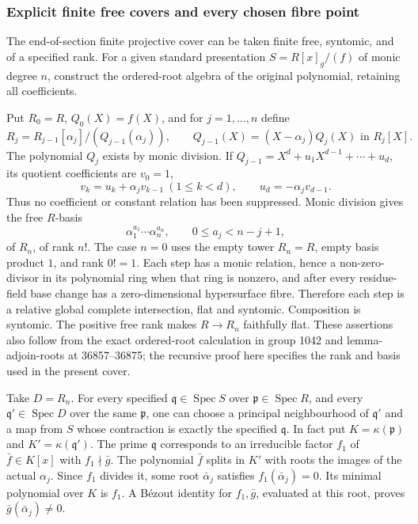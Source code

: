 \subsubsection{Explicit finite free covers and every chosen fibre point}\label{algebra-proof-052-explicit-finite-free-covers-and-every-chosen-fibre-point}

The end-of-section finite projective cover can be taken finite free, syntomic, and of a specified rank. For a given standard presentation \(S=R[x]_g/(f)\) of monic degree \(n\), construct the ordered-root algebra of the original polynomial, retaining all coefficients.

Put \(R_0=R\), \(Q_0(X)=f(X)\), and for \(j=1,\ldots,n\) define \[
R_j=R_{j-1}[\alpha_j]/(Q_{j-1}(\alpha_j)),
\qquad
Q_{j-1}(X)=(X-\alpha_j)Q_j(X)\text{ in }R_j[X].
\] The polynomial \(Q_j\) exists by monic division. If \(Q_{j-1}=X^d+u_1X^{d-1}+\cdots+u_d\), its quotient coefficients are \(v_0=1\), \[
v_k=u_k+\alpha_jv_{k-1}\ (1\le k<d),
\qquad u_d=-\alpha_jv_{d-1}.
\] Thus no coefficient or constant relation has been suppressed. Monic division gives the free \(R\)-basis \[
\alpha_1^{a_1}\cdots\alpha_n^{a_n},
\qquad 0\le a_j<n-j+1,
\] of \(R_n\), of rank \(n!\). The case \(n=0\) uses the empty tower \(R_n=R\), empty basis product \(1\), and rank \(0!=1\). Each step has a monic relation, hence a non-zero-divisor in its polynomial ring when that ring is nonzero, and after every residue-field base change has a zero-dimensional hypersurface fibre. Therefore each step is a relative global complete intersection, flat and syntomic. Composition is syntomic. The positive free rank makes \(R\to R_n\) faithfully flat. These assertions also follow from the exact ordered-root calculation in group 1042 and lemma-adjoin-roots at 36857--36875; the recursive proof here specifies the rank and basis used in the present cover.

Take \(D=R_n\). For every specified \(\mathfrak q\in\operatorname{Spec}S\) over \(\mathfrak p\in\operatorname{Spec}R\), and every \(\mathfrak q'\in\operatorname{Spec}D\) over the same \(\mathfrak p\), one can choose a principal neighbourhood of \(\mathfrak q'\) and a map from \(S\) whose contraction is exactly the specified \(\mathfrak q\). In fact put \(K=\kappa(\mathfrak p)\) and \(K'=\kappa(\mathfrak q')\). The prime \(\mathfrak q\) corresponds to an irreducible factor \(f_1\) of \(\bar f\in K[x]\) with \(f_1\nmid\bar g\). The polynomial \(\bar f\) splits in \(K'\) with roots the images of the actual \(\alpha_j\). Since \(f_1\) divides it, some root \(\bar\alpha_j\) satisfies \(f_1(\bar\alpha_j)=0\). Its minimal polynomial over \(K\) is \(f_1\). A Bézout identity for \(f_1,\bar g\), evaluated at this root, proves \(\bar g(\bar\alpha_j)\ne0\).

